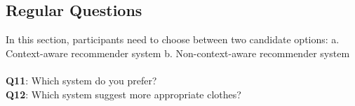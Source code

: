\subsection{Regular Questions} 
In this section, participants need to choose between two candidate options: a. Context-aware recommender system b. Non-context-aware recommender system
\\ \\
\textbf{Q11}: Which system do you prefer? \\
\textbf{Q12}: Which system suggest more appropriate clothes? \\


